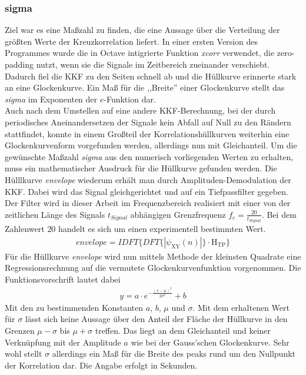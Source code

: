 \subsubsection{sigma}
Ziel war es eine Maßzahl zu finden, die eine Aussage über die Verteilung der größten Werte der Kreuzkorrelation liefert. In einer ersten Version des Programmes wurde die in Octave intigrierte Funktion \textit{xcorr} verwendet, die zero-padding nutzt, wenn sie die Signale im Zeitbereich zueinander verschiebt. Dadurch fiel die KKF zu den Seiten schnell ab und die Hüllkurve erinnerte stark an eine Glockenkurve. Ein Maß für die ,,Breite'' einer Glockenkurve stellt das \textit{sigma} im Exponenten der $e$-Funktion dar. 
\\Auch nach dem Umstellen auf eine andere KKF-Berechnung, bei der durch periodisches Aneinandersetzen der Signale kein Abfall auf Null zu den Rändern stattfindet, konnte in einem Großteil der Korrelationshüllkurven weiterhin eine Glockenkurvenform vorgefunden werden, allerdings nun mit Gleichanteil. Um die gewünschte Maßzahl \textit{sigma} aus den numerisch vorliegenden Werten zu erhalten, muss ein mathematischer Ausdruck für die Hüllkurve gefunden werden. Die Hülllkurve \textit{envelope} wiederum erhält man durch Amplituden-Demodulation der KKF. Dabei wird das Signal gleichgerichtet und auf ein Tiefpassfilter gegeben. Der Filter wird in dieser Arbeit im Frequenzbereich realisiert mit einer von der zeitlichen Länge des Signals $t_{Signal}$ abhängigen Grenzfrequenz $f_{c} = \frac{20}{t_{Signal}}$. Bei dem Zahlenwert $20$ handelt es sich um einen experimentell bestimmten Wert. 
\begin{align*}
envelope = IDFT\lbrace DFT\lbrace|\psi_{\text{XY}}(n)|\rbrace\cdot\text{H}_{\text{TP}}\rbrace
\end{align*}
Für die Hüllkurve \textit{envelope} wird nun mittels Methode der kleinsten Quadrate eine Regressionsrechnung auf die vermutete Glockenkurvenfunktion vorgenommen. Die Funktionsvorschrift lautet dabei
\begin{align*}
y = a\cdot e^{-\frac{(x-\mu)^2}{2\sigma^2}}+b
\end{align*}
Mit den zu bestimmenden Konstanten $a$, $b$, $\mu$ und $\sigma$. Mit dem erhaltenen Wert für $\sigma$ lässt sich keine Aussage über den Anteil der Fläche der Hüllkurve in den Grenzen $\mu-\sigma$ bis $\mu+\sigma$ treffen. Das liegt an dem Gleichanteil und keiner Verknüpfung mit der Amplitude $a$ wie bei der Gauss'schen Glockenkurve. Sehr wohl stellt $\sigma$ allerdings ein Maß für die Breite des peaks rund um den Nullpunkt der Korrelation dar. Die Angabe erfolgt in Sekunden. 
